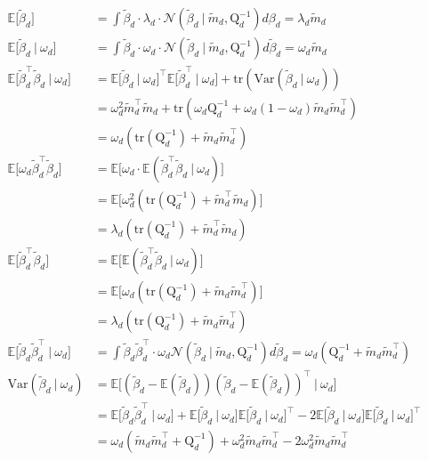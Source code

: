 \documentclass[twoside,11pt]{article}
\newcommand\given[1][]{\:#1\vert\:}
\newcommand{\transpose}[1]{#1^{\intercal}}
\newcommand{\E}{\mathbb{E}}
\newcommand{\betad}{\tilde{\beta}_d}
\newcommand{\qmat}{\mathrm{Q}}
\newcommand{\qbeta}{\mathcal{N} \left( \betad \given \tilde{m}_d, \qmat_d^{-1} \right)}
\newcommand{\trace}[1]{\mathrm{tr} \left( #1 \right)}
\newcommand{\var}[1]{\mathrm{Var}\left(#1\right)}
\begin{document}
\begin{align*}
	\E \Big[ \betad \Big] &= \int \betad \cdot  \lambda_d \cdot \qbeta d\beta_d = \lambda_d \tilde{m}_d \\
	\E \Big[ \betad \given \omega_d \Big] &= \int  \betad \cdot \omega_d \cdot \qbeta d \betad = \omega_d \tilde{m}_d \\
	\E \Big[ \transpose{\betad} \betad \given \omega_d \Big] &= \transpose{\E \Big[ \betad \given \omega_d \Big]} \E \Big[ \transpose{\betad} \given \omega_d \Big] + \trace{\var{\betad \given \omega_d}} \\
	&= \omega_d^2 \transpose{\tilde{m}_d} \tilde{m}_d + \trace{\omega_d \qmat_d^{-1} + \omega_d(1 - \omega_d) \tilde{m}_d \transpose{\tilde{m}_d}} \\
	&= \omega_d \left( \trace{\qmat_d^{-1}} + \tilde{m}_d \transpose{\tilde{m}_d} \right) \\
	\E \Big[ \omega_d \transpose{\betad} \betad \Big] &= \E \Big[ \omega_d \cdot \E \left( \transpose{\betad} \betad \given \omega_d\right) \Big] \\
	&= \E \Big[ \omega_d^2 \left( \trace{\qmat_d^{-1}} + \transpose{\tilde{m}_d} \tilde{m}_d \right)\Big] \\
	&= \lambda_d \left( \trace{\qmat_d^{-1}} + \transpose{\tilde{m}_d} \tilde{m}_d\right) \\
	\E \Big[ \transpose{\betad} \betad\Big] &= \E \Big[ \E \left( \transpose{\betad} \betad \given \omega_d\right)\Big] \\
	&= \E \Big[ \omega_d \left( \trace{\qmat_d^{-1}} + \tilde{m}_d \transpose{\tilde{m}_d} \right) \Big]\\
	&= \lambda_d \left( \trace{\qmat_d^{-1}} + \tilde{m}_d \transpose{\tilde{m}_d} \right)\\
	\E \Big[ \betad \transpose{\betad} \given \omega_d \Big] &= \int \betad \transpose{\betad} \cdot \omega_d \qbeta d\betad  = \omega_d \left( \qmat_d^{-1} + \tilde{m}_d \transpose{\tilde{m}_d} \right) \\
	\var{\betad \given \omega_d} &= \E\Big[  (\betad - \E(\betad))\transpose{(\betad - \E(\betad))} \given \omega_d \Big] \\
	&= \E\Big[\betad \transpose{\betad} \given \omega_d \Big] + \E \Big[ \betad \given \omega_d \Big] \transpose{\E \Big[ \betad \given \omega_d \Big]} - 2 \E \Big[ \betad \given \omega_d \Big] \transpose{\E \Big[ \betad \given \omega_d \Big]} \\
	&= \omega_d \left( \tilde{m}_d \transpose{\tilde{m}_d} + \qmat_d^{-1} \right) + \omega_d^2 \tilde{m}_d \transpose{\tilde{m}_d} - 2\omega_d^2 \tilde{m}_d\transpose{\tilde{m}_d} \\

\end{align*}
\end{document}
